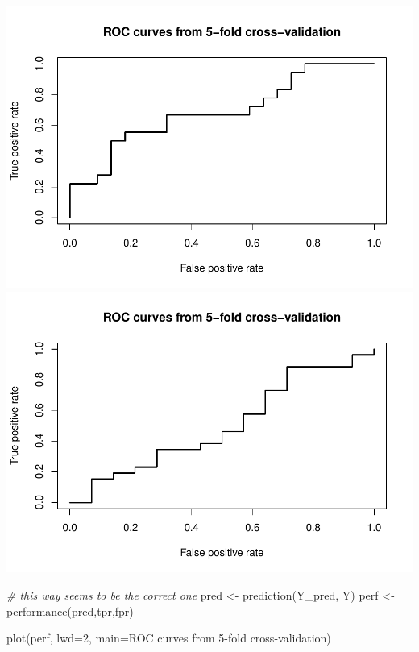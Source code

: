 \documentclass[
  11pt,
]{article}
\newenvironment{Shaded}{\begin{snugshade}}{\end{snugshade}}
\newcommand{\AttributeTok}[1]{\textcolor[rgb]{0.77,0.63,0.00}{#1}}
\newcommand{\CommentTok}[1]{\textcolor[rgb]{0.56,0.35,0.01}{\textit{#1}}}
\newcommand{\DecValTok}[1]{\textcolor[rgb]{0.00,0.00,0.81}{#1}}
\newcommand{\FunctionTok}[1]{\textcolor[rgb]{0.00,0.00,0.00}{#1}}
\newcommand{\NormalTok}[1]{#1}
\newcommand{\OtherTok}[1]{\textcolor[rgb]{0.56,0.35,0.01}{#1}}
\newcommand{\StringTok}[1]{\textcolor[rgb]{0.31,0.60,0.02}{#1}}
\begin{document}
\includegraphics{final_GCM_files/figure-latex/unnamed-chunk-10-4.pdf}
\includegraphics{final_GCM_files/figure-latex/unnamed-chunk-10-5.pdf}

\begin{Shaded}
\begin{Highlighting}[]
\CommentTok{\# this way seems to be the correct one}
\NormalTok{pred }\OtherTok{\textless{}{-}} \FunctionTok{prediction}\NormalTok{(Y\_pred, Y)}
\NormalTok{perf }\OtherTok{\textless{}{-}} \FunctionTok{performance}\NormalTok{(pred,}\StringTok{\textquotesingle{}tpr\textquotesingle{}}\NormalTok{,}\StringTok{\textquotesingle{}fpr\textquotesingle{}}\NormalTok{)}


\FunctionTok{plot}\NormalTok{(perf,}
     \AttributeTok{lwd=}\DecValTok{2}\NormalTok{,}
     \AttributeTok{main=}\StringTok{\textquotesingle{}ROC curves from 5{-}fold cross{-}validation\textquotesingle{}}\NormalTok{)}
\end{Highlighting}
\end{Shaded}
\end{document}
